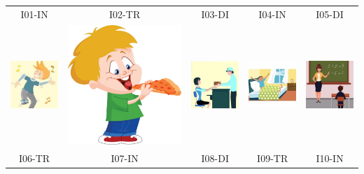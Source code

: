 \documentclass[12pt,notitlepage]{article}
\date{}
\begin{document}

\begin{center}
\begin{tabular}{|c||c||c||c||c|}
\hline
I01-IN & I02-TR & I03-DI & I04-IN & I05-DI \\
\includegraphics[width=0.16\columnwidth]{square/I01.jpg} & \includegraphics[width=0.16\columnwidth]{figures/I02.jpg} &  \includegraphics[width=0.16\columnwidth]{square/I03.jpg} &  \includegraphics[width=0.16\columnwidth]{square/I04.jpg} & \includegraphics[width=0.16\columnwidth]{square/I05.jpg} \\
\hline
\hline
I06-TR & I07-IN & I08-DI & I09-TR & I10-IN \\

\end{tabular}
\end{center}
\end{document}
